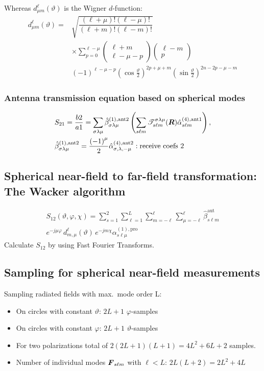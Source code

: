 Whereas $d_{\mu m}^{\ell}(\vartheta)$ is the Wigner $d$-function:
\begin{align*}
  d_{\mu m}^{\ell}(\vartheta) = &\sqrt{\dfrac{(\ell + \mu)! (\ell - \mu)!}{(\ell + m)! (\ell - m)!}}\\
  &\times \sum\limits_{p=0}^{\ell - \mu}
  \begin{pmatrix}
    \ell + m\\
    \ell - \mu - p
  \end{pmatrix}
  \begin{pmatrix}
    \ell - m\\
    p
  \end{pmatrix}\\
  &{(-1)}^{\ell-\mu-p}
  {(\cos \frac{\vartheta}{2})}^{2p+\mu+m} {(\sin \frac{\vartheta}{2})}^{2n-2p-\mu-m}
\end{align*}

\subsubsection{Antenna transmission equation based on spherical modes}
\begin{align*}
  &S_{21} = \dfrac{b2}{a1} = \sum\limits_{\sigma\lambda\mu}\hat{\beta}_{\sigma\lambda\mu}^{(1),\text{ant2}}\left(\sum\limits_{s\ell m}\mathscr{T}_{s\ell m}^{\sigma\lambda\mu}(\boldsymbol{R}) \hat{\alpha}_{s\ell m}^{(4),\text{ant1}}\right),\\
  &\hat{\beta}_{\sigma\lambda\mu}^{(1),\text{ant2}} = \dfrac{{(-1)}^{\mu}}{2} \hat{\alpha}_{\sigma,\lambda,-\mu}^{(4),\text{ant2}}:\text{receive coefs 2}
\end{align*}

\subsection{Spherical near-field to far-field transformation: The Wacker algorithm}
\begin{align*}
  S_{12}(\vartheta,\varphi,\chi) = \sum\limits_{s=1}^{2}\sum\limits_{\ell=1}^{L}\sum\limits_{m=-\ell}^{\ell}\sum\limits_{\mu=-\ell}^{\ell} \hat{\beta}_{s\ell m}^{\text{aut}}\\
  e^{-j\mu\varphi}\,d_{m,\mu}^{\ell}(\vartheta) \, e^{-jm\chi}\alpha_{s\ell \mu}^{(1),\text{pro}}
\end{align*}
Calculate $S_{12}$ by using Fast Fourier Transforms.

\subsection{Sampling for spherical near-field measurements}
Sampling radiated fields with max.\ mode order L:
\begin{itemize}
        \item On circles with constant $\vartheta$: $2L+1$ $\varphi$-samples
        \item On circles with constant $\varphi$: $2L+1$ $\vartheta$-samples
        \item For two polarizations total of $2(2L + 1)(L + 1) = 4L^{2}+6L + 2$ samples.
        \item Number of individual modes $\boldsymbol{F}_{s\ell m}$ with $\ell < L$: $2L(L + 2) = 2L^{2} + 4L$
\end{itemize}
